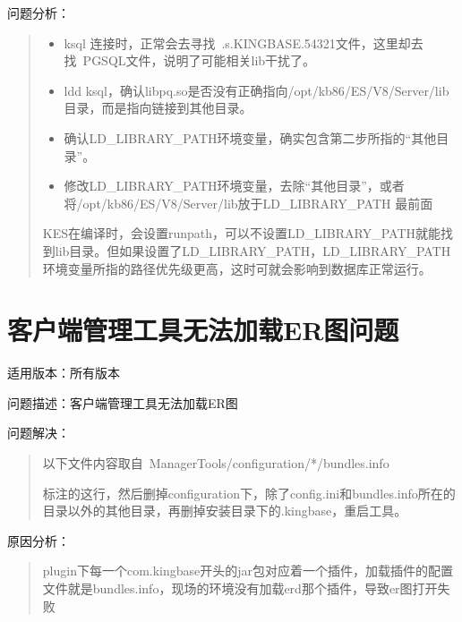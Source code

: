 \documentclass[a4,10pt,oneside,english]{sphinxmanual}
\let\sphinxpxdimen\pdfpxdimen\else\newdimen\sphinxpxdimen
\begin{document}
问题分析：
\begin{quote}
\begin{itemize}
\item {} 
ksql 连接时，正常会去寻找 .s.KINGBASE.54321文件，这里却去找 PGSQL文件，说明了可能相关lib干扰了。

\item {} 
ldd ksql，确认libpq.so是否没有正确指向/opt/kb86/ES/V8/Server/lib目录，而是指向链接到其他目录。

\item {} 
确认LD\_LIBRARY\_PATH环境变量，确实包含第二步所指的“其他目录”。

\item {} 
修改LD\_LIBRARY\_PATH环境变量，去除“其他目录”，或者将/opt/kb86/ES/V8/Server/lib放于LD\_LIBRARY\_PATH 最前面

\end{itemize}

KES在编译时，会设置runpath，可以不设置LD\_LIBRARY\_PATH就能找到lib目录。但如果设置了LD\_LIBRARY\_PATH，LD\_LIBRARY\_PATH环境变量所指的路径优先级更高，这时可就会影响到数据库正常运行。
\end{quote}


\section{客户端管理工具无法加载ER图问题}
\label{\detokenize{tools:er}}
适用版本：所有版本

问题描述：客户端管理工具无法加载ER图

问题解决：
\begin{quote}

以下文件内容取自 ManagerTools/configuration/*/bundles.info

\begin{figure}[H]
\centering

\noindent\sphinxincludegraphics[width=650\sphinxpxdimen,height=148\sphinxpxdimen]{{FAQ28979}.png}
\end{figure}

标注的这行，然后删掉configuration下，除了config.ini和bundles.info所在的目录以外的其他目录，再删掉安装目录下的.kingbase，重启工具。
\end{quote}

原因分析：
\begin{quote}

plugin下每一个com.kingbase开头的jar包对应着一个插件，加载插件的配置文件就是bundles.info，现场的环境没有加载erd那个插件，导致er图打开失败
\end{quote}
\end{document}
